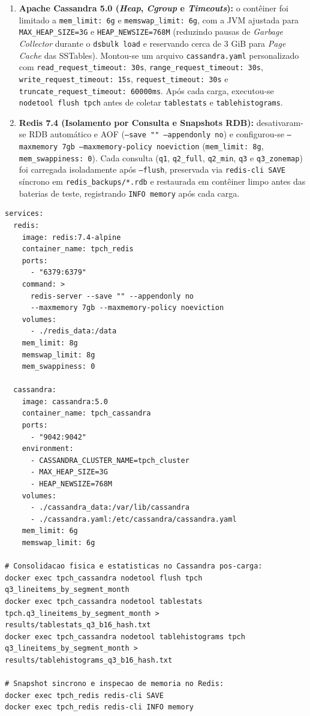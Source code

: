\documentclass[12pt,a4paper]{article}
\begin{document}
\begin{enumerate}
    \item \textbf{Apache Cassandra 5.0 (\textit{Heap}, \textit{Cgroup} e \textit{Timeouts}):} o contêiner foi limitado a \texttt{mem\_limit: 6g} e \texttt{memswap\_limit: 6g}, com a JVM ajustada para \texttt{MAX\_HEAP\_SIZE=3G} e \texttt{HEAP\_NEWSIZE=768M} (reduzindo pausas de \textit{Garbage Collector} durante o \texttt{dsbulk load} e reservando cerca de 3 GiB para \textit{Page Cache} das SSTables). Montou-se um arquivo \texttt{cassandra.yaml} personalizado com \texttt{read\_request\_timeout: 30s}, \texttt{range\_request\_timeout: 30s}, \texttt{write\_request\_timeout: 15s}, \texttt{request\_timeout: 30s} e \texttt{truncate\_request\_timeout: 60000ms}. Após cada carga, executou-se \texttt{nodetool flush tpch} antes de coletar \texttt{tablestats} e \texttt{tablehistograms}.
    \item \textbf{Redis 7.4 (Isolamento por Consulta e Snapshots RDB):} desativaram-se RDB automático e AOF (\texttt{--save "" --appendonly no}) e configurou-se \texttt{--maxmemory 7gb --maxmemory-policy noeviction} (\texttt{mem\_limit: 8g}, \texttt{mem\_swappiness: 0}). Cada consulta (\texttt{q1}, \texttt{q2\_full}, \texttt{q2\_min}, \texttt{q3} e \texttt{q3\_zonemap}) foi carregada isoladamente após \texttt{--flush}, preservada via \texttt{redis-cli SAVE} síncrono em \texttt{redis\_backups/*.rdb} e restaurada em contêiner limpo antes das baterias de teste, registrando \texttt{INFO memory} após cada carga.
\end{enumerate}

\begin{lstlisting}[caption={Configuração do \texttt{docker-compose.yml} e comandos operacionais de consolidação e coleta.}]
services:
  redis:
    image: redis:7.4-alpine
    container_name: tpch_redis
    ports:
      - "6379:6379"
    command: >
      redis-server --save "" --appendonly no
      --maxmemory 7gb --maxmemory-policy noeviction
    volumes:
      - ./redis_data:/data
    mem_limit: 8g
    memswap_limit: 8g
    mem_swappiness: 0

  cassandra:
    image: cassandra:5.0
    container_name: tpch_cassandra
    ports:
      - "9042:9042"
    environment:
      - CASSANDRA_CLUSTER_NAME=tpch_cluster
      - MAX_HEAP_SIZE=3G
      - HEAP_NEWSIZE=768M
    volumes:
      - ./cassandra_data:/var/lib/cassandra
      - ./cassandra.yaml:/etc/cassandra/cassandra.yaml
    mem_limit: 6g
    memswap_limit: 6g

# Consolidacao fisica e estatisticas no Cassandra pos-carga:
docker exec tpch_cassandra nodetool flush tpch q3_lineitems_by_segment_month
docker exec tpch_cassandra nodetool tablestats tpch.q3_lineitems_by_segment_month > results/tablestats_q3_b16_hash.txt
docker exec tpch_cassandra nodetool tablehistograms tpch q3_lineitems_by_segment_month > results/tablehistograms_q3_b16_hash.txt

# Snapshot sincrono e inspecao de memoria no Redis:
docker exec tpch_redis redis-cli SAVE
docker exec tpch_redis redis-cli INFO memory
\end{lstlisting}
\end{document}
